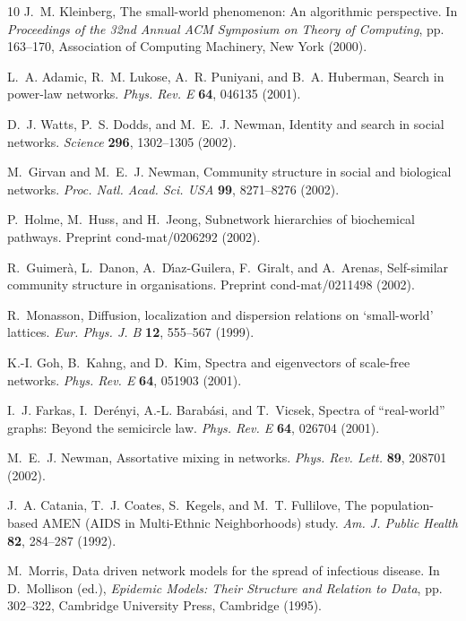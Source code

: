 \documentclass[twocolumn,pre]{revtex4}
\begin{document}
\begin{thebibliography}{10}
J.~M. Kleinberg, The small-world phenomenon: An algorithmic perspective. In
  \textit{Proceedings of the 32nd Annual {ACM} Symposium on Theory of
  Computing}, pp. 163--170, Association of Computing Machinery, New York
  (2000).

L.~A. Adamic, R.~M. Lukose, A.~R. Puniyani, and B.~A. Huberman, Search in
  power-law networks. \textit{Phys. Rev. E} \textbf{64}, 046135 (2001).

D.~J. Watts, P.~S. Dodds, and M.~E.~J. Newman, Identity and search in social
  networks. \textit{Science} \textbf{296}, 1302--1305 (2002).

M.~Girvan and M.~E.~J. Newman, Community structure in social and biological
  networks. \textit{Proc. Natl. Acad. Sci. USA} \textbf{99}, 8271--8276 (2002).

P.~Holme, M.~Huss, and H.~Jeong, Subnetwork hierarchies of biochemical
  pathways. Preprint cond-mat/0206292 (2002).

R.~Guimer\`a, L.~Danon, A.~D\'\i{}az-Guilera, F.~Giralt, and A.~Arenas,
  Self-similar community structure in organisations. Preprint cond-mat/0211498
  (2002).

R.~Monasson, Diffusion, localization and dispersion relations on `small-world'
  lattices. \textit{Eur. Phys. J. B} \textbf{12}, 555--567 (1999).

K.-I. Goh, B.~Kahng, and D.~Kim, Spectra and eigenvectors of scale-free
  networks. \textit{Phys. Rev. E} \textbf{64}, 051903 (2001).

I.~J. Farkas, I.~Der\'enyi, A.-L. Barab\'asi, and T.~Vicsek, Spectra of
  ``real-world'' graphs: Beyond the semicircle law. \textit{Phys. Rev. E}
  \textbf{64}, 026704 (2001).

M.~E.~J. Newman, Assortative mixing in networks. \textit{Phys. Rev. Lett.}
  \textbf{89}, 208701 (2002).

J.~A. Catania, T.~J. Coates, S.~Kegels, and M.~T. Fullilove, The
  population-based {AMEN} ({AIDS} in {M}ulti-{E}thnic {N}eighborhoods) study.
  \textit{Am. J. Public Health} \textbf{82}, 284--287 (1992).

M.~Morris, Data driven network models for the spread of infectious disease. In
  D.~Mollison (ed.), \textit{Epidemic Models: Their Structure and Relation to
  Data}, pp. 302--322, Cambridge University Press, Cambridge (1995).


\end{thebibliography}
\end{document}
